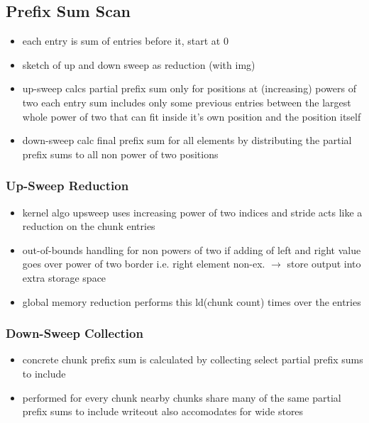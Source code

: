 \documentclass{tudscrreprt}
\begin{document}
		\subsection{Prefix Sum Scan}
			\begin{itemize}
				\item each entry is sum of entries before it, start at 0
				\item sketch of up and down sweep as reduction (with img)
				\item up-sweep calcs partial prefix sum
					\subitem only for positions at (increasing) powers of two
					\subitem each entry sum includes only some previous entries
						\subsubitem between the largest whole power of two that can fit inside it's own position
						\subsubitem and the position itself
				\item down-sweep calc final prefix sum for all elements
					\subitem by distributing the partial prefix sums to all non power of two positions
			\end{itemize}
		
			\subsubsection{Up-Sweep Reduction}
				\begin{itemize}
					\item kernel algo upsweep uses increasing power of two indices and stride
						\subitem acts like a reduction on the chunk entries
					\item out-of-bounds handling for non powers of two
						\subitem if adding of left and right value goes over power of two border
						\subitem i.e. right element non-ex. $\rightarrow$ store output into extra storage space
					\item global memory reduction performs this ld(chunk count) times over the entries
				\end{itemize}
			
			\subsubsection{Down-Sweep Collection}
				\begin{itemize}
					\item concrete chunk prefix sum is calculated by collecting select partial prefix sums to include
					\item performed for every chunk
						\subitem nearby chunks share many of the same partial prefix sums to include
						\subitem writeout also accomodates for wide stores
				\end{itemize}
			
\end{document}
